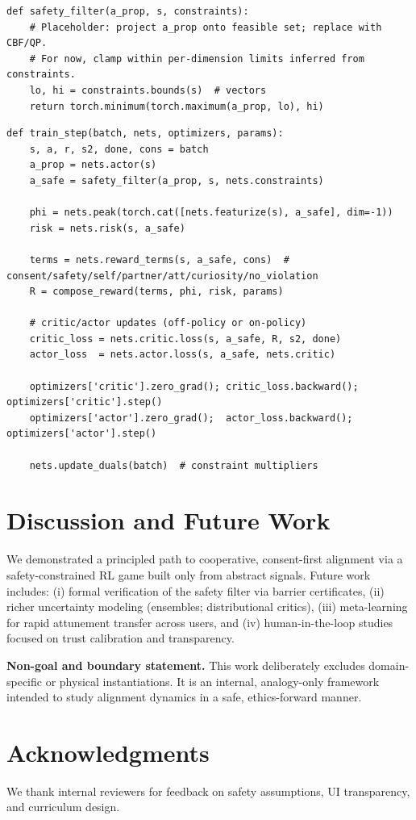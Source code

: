 \documentclass[12pt]{article}
\begin{document}
\begin{lstlisting}[style=code]
def safety_filter(a_prop, s, constraints):
    # Placeholder: project a_prop onto feasible set; replace with CBF/QP.
    # For now, clamp within per-dimension limits inferred from constraints.
    lo, hi = constraints.bounds(s)  # vectors
    return torch.minimum(torch.maximum(a_prop, lo), hi)
\end{lstlisting}

\begin{lstlisting}[style=code]
def train_step(batch, nets, optimizers, params):
    s, a, r, s2, done, cons = batch
    a_prop = nets.actor(s)
    a_safe = safety_filter(a_prop, s, nets.constraints)

    phi = nets.peak(torch.cat([nets.featurize(s), a_safe], dim=-1))
    risk = nets.risk(s, a_safe)

    terms = nets.reward_terms(s, a_safe, cons)  # consent/safety/self/partner/att/curiosity/no_violation
    R = compose_reward(terms, phi, risk, params)

    # critic/actor updates (off-policy or on-policy)
    critic_loss = nets.critic.loss(s, a_safe, R, s2, done)
    actor_loss  = nets.actor.loss(s, a_safe, nets.critic)

    optimizers['critic'].zero_grad(); critic_loss.backward(); optimizers['critic'].step()
    optimizers['actor'].zero_grad();  actor_loss.backward();  optimizers['actor'].step()

    nets.update_duals(batch)  # constraint multipliers
\end{lstlisting}

\section{Discussion and Future Work}
We demonstrated a principled path to cooperative, consent-first alignment via a safety-constrained RL game built only from abstract signals. Future work includes: (i) formal verification of the safety filter via barrier certificates, (ii) richer uncertainty modeling (ensembles; distributional critics), (iii) meta-learning for rapid attunement transfer across users, and (iv) human-in-the-loop studies focused on trust calibration and transparency.
\vspace{8pt}

\noindent\textbf{Non-goal and boundary statement.} This work deliberately excludes domain-specific or physical instantiations. It is an internal, analogy-only framework intended to study alignment dynamics in a safe, ethics-forward manner.

\section*{Acknowledgments}
We thank internal reviewers for feedback on safety assumptions, UI transparency, and curriculum design.

\end{document}
